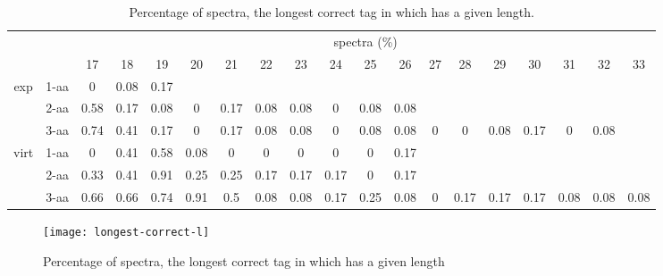 \documentclass{article}[12pt]
\begin{document}
\begin{landscape}
\begin{table}[h]\tiny
\vspace{3mm}
{\centering
\begin{center}
\begin{tabular}{|c|l|c|c|c|c|c|c|c|c|c|c|c|c|c|c|c|c|c|}
  \hline
  \multicolumn{2}{|c|}{ } & \multicolumn{ 17 }{|c|}{ spectra (\%)} \\
  \cline{3- 19}
  \multicolumn{2}{|c|}{ }  & 17 & 18 & 19 & 20 & 21 & 22 & 23 & 24 & 25 & 26 & 27 & 28 & 29 & 30 & 31 & 32 & 33\\
  \hline
  \multirow{3}{*}{exp}
&  1-aa  & 0 & 0.08 & 0.17 &  &  &  &  &  &  &  &  &  &  &  &  &  & \\
&  2-aa  & 0.58 & 0.17 & 0.08 & 0 & 0.17 & 0.08 & 0.08 & 0 & 0.08 & 0.08 &  &  &  &  &  &  & \\
&  3-aa  & 0.74 & 0.41 & 0.17 & 0 & 0.17 & 0.08 & 0.08 & 0 & 0.08 & 0.08 & 0 & 0 & 0.08 & 0.17 & 0 & 0.08 & \\
 \hline
  \multirow{3}{*}{virt} 
&  1-aa  & 0 & 0.41 & 0.58 & 0.08 & 0 & 0 & 0 & 0 & 0 & 0.17 &  &  &  &  &  &  & \\
&  2-aa  & 0.33 & 0.41 & 0.91 & 0.25 & 0.25 & 0.17 & 0.17 & 0.17 & 0 & 0.17 &  &  &  &  &  &  & \\
&  3-aa  & 0.66 & 0.66 & 0.74 & 0.91 & 0.5 & 0.08 & 0.08 & 0.17 & 0.25 & 0.08 & 0 & 0.17 & 0.17 & 0.17 & 0.08 & 0.08 & 0.08\\
 \hline
\end{tabular}
\end{center}
\par}
\centering
\caption{ Percentage of spectra, the longest correct tag in which has a given length.}
\label{table:longest-correct-l}
\vspace{3mm}
\end{table}

\end{landscape}

\begin{figure}
  \begin{center}
\texttt{[image: longest-correct-l]}
\end{center}
\caption{Percentage of spectra, the longest correct tag in which has a given length}
  \label{fig:longest-correct-l}
\end{figure}
\end{document}
